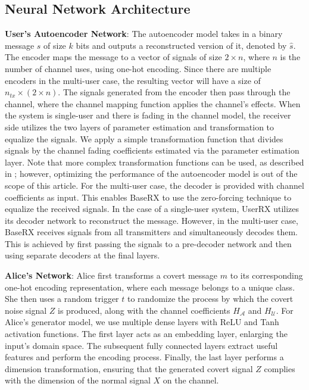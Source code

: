 \subsection{Neural Network Architecture}
\textbf{User's Autoencoder Network}: The autoencoder model takes in a binary message \(s\) of size \(k\) bits and outputs a reconstructed version of it, denoted by \(\hat{s}\). The encoder maps the message to a vector of signals of size \(2 \times n\), where \(n\) is the number of channel uses, using one-hot encoding. Since there are multiple encoders in the multi-user case, the resulting vector will have a size of \(n_{tx} \times (2 \times n)\). The signals generated from the encoder then pass through the channel, where the channel mapping function applies the channel's effects. When the system is single-user and there is fading in the channel model, the receiver side utilizes the two layers of parameter estimation and transformation to equalize the signals. We apply a simple transformation function that divides signals by the channel fading coefficients estimated via the parameter estimation layer. Note that more complex transformation functions can be used, as described in \cite{o2017introduction}; however, optimizing the performance of the autoencoder model is out of the scope of this article. For the multi-user case, the decoder is provided with channel coefficients as input. This enables BaseRX to use the zero-forcing technique \cite{garg2010wireless} to equalize the received signals. In the case of a single-user system, UserRX utilizes its decoder network to reconstruct the message. However, in the multi-user case, BaseRX receives signals from all transmitters and simultaneously decodes them. This is achieved by first passing the signals to a pre-decoder network and then using separate decoders at the final layers.


\textbf{Alice's Network}: Alice first transforms a covert message \(m\) to its corresponding one-hot encoding representation, where each message belongs to a unique class. She then uses a random trigger \(t\) to randomize the process by which the covert noise signal \(Z\) is produced, along with the channel coefficients \(H_{\mathcal{A}}\) and \(H_{\mathcal{U}}\). For Alice's generator model, we use multiple dense layers with ReLU and Tanh activation functions. The first layer acts as an embedding layer, enlarging the input's domain space. The subsequent fully connected layers extract useful features and perform the encoding process. Finally, the last layer performs a dimension transformation, ensuring that the generated covert signal \(Z\) complies with the dimension of the normal signal \(X\) on the channel. 


